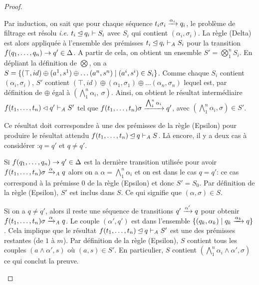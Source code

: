 \begin{proof}
\begin{itemize}
  Par induction, on sait que pour chaque séquence $t_i\sigma_i
  \xrightarrow{\alpha_i} q_i$, le problème de filtrage est résolu \textit{i.e.}
  $t_i \unlhd q_i \vdash S_i$ avec $S_i$ qui contient $(\alpha_i, \sigma_i)$.
  La règle (Delta) est alors appliquée à l'ensemble des prémisses $t_i \unlhd q_i \vdash_\mathit A S_i$ pour la transition $f(q_1,\dots,q_n) \rightarrow q' \in \Delta$.  A partir de cela,
  on obtient un ensemble $S' = \bigotimes^n_1 S_i$.  En dépliant la définition de $\bigotimes$, on a $S = \{(\top, id) \oplus (a^1, s^1) \oplus \dots (a^n, s^n) \; | \; (a^i, s^i) \in S_i \}$. 
  Comme chaque $S_i$ contient $(\alpha_i, \sigma_i)$, $S'$ contient $(\top, id) \oplus (\alpha_1, \sigma_1) \oplus \dots (\alpha_n, \sigma_n)$ lequel est, par définition de $\oplus$ égal à $(\bigwedge_1^n \alpha_i,\ \sigma)$.
  Ainsi, on obtient le résultat intermédiaire $f(t_1, \dots, t_n) \lhd q' \vdash_\mathit A S'$ tel que $f(t_1, \dots, t_n)\sigma \xrightarrow{\bigwedge_1^n \alpha_i} q'$,
  avec $(\bigwedge_1^n \alpha_i, \sigma) \in S'$.

  Ce résultat doit correspondre à une des prémisses de la règle (Epsilon) pour produire le résultat attendu $f(t_1,\dots, t_n) \unlhd q \vdash_\mathit A S$.
  Là encore, il y a deux cas à considérer :$q=q'$ et $q \not = q'$.

  Si $f(q_1,\dots,q_n) \rightarrow q' \in \Delta$ est la dernière transition utilisée pour avoir $f(t_1, \dots, t_n)\sigma \xrightarrow{\alpha}_\mathit A q$ alors
  on a $\alpha = \bigwedge_1^n \alpha_i$ et on est dans le cas $q = q'$: ce cas correspond à la prémisse $0$ de la règle (Epsilon) et donc $S' = S_0$.
  Par définition de la règle (Epsilon), $S'$ est inclus dans $S$. Ce qui signifie que $(\alpha, \sigma) \in S$.

  Si on a $q \not= q'$, alors il reste une séquence de transitions $q' \xrightarrow{\alpha'} q$ pour obtenir $f(t_1, \dots, t_n)\sigma \xrightarrow{\alpha}_\mathit A q$.
  Le couple $(\alpha', q')$ est dans l'ensemble $\{ (q_k, \alpha_k) \; | \; q_k \xrightarrow{\alpha_k} q\}$.%
  Cela implique que le résultat $f(t_1,\dots, t_n) \unlhd q \vdash_\mathit A S'$ est une des prémisses restantes (de $1$ à $m$).
  Par définition de la règle (Epsilon), $S$ contient tous les couples $(a \land \alpha', s)$ où $(a, s) \in S'$. 
  En particulier, $S$ contient $(\bigwedge_1^n \alpha_i \land \alpha', \sigma)$ ce qui conclut la preuve.
\end{itemize}
\end{proof}

